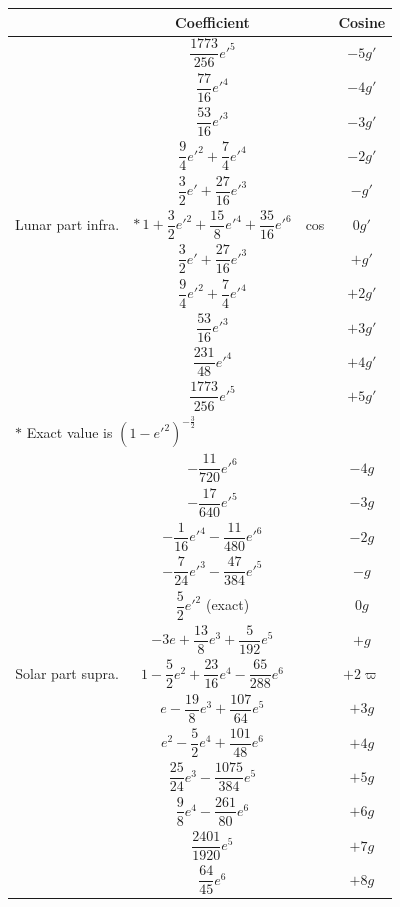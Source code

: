 \documentclass[10pt,a4paper]{article}
\theoremstyle{definition}
\begin{document}
\begin{center}
\begin{tabular}{c|c|c|c}
\toprule
& Coefficient & & Cosine \\
\midrule
\multirow{11}{*}{\parbox{2.5cm}{\centering Lunar part infra.}} 
& $\dfrac{1773}{256}e'^5$ & \multirow{11}{*}{cos} & $-5g'$ \\
& $\dfrac{77}{16}e'^4$ & & $-4g'$ \\
& $\dfrac{53}{16}e'^3$ & & $-3g'$ \\
& $\dfrac{9}{4}e'^2 + \dfrac{7}{4}e'^4$ & & $-2g'$ \\
& $\dfrac{3}{2}e' + \dfrac{27}{16}e'^3$ & & $-g'$ \\
& $*\,1 + \dfrac{3}{2}e'^2 + \dfrac{15}{8}e'^4 + \dfrac{35}{16}e'^6$ & & $0g'$ \\
& $\dfrac{3}{2}e' + \dfrac{27}{16}e'^3$ & & $+g'$ \\
& $\dfrac{9}{4}e'^2 + \dfrac{7}{4}e'^4$ & & $+2g'$ \\
& $\dfrac{53}{16}e'^3$ & & $+3g'$ \\
& $\dfrac{231}{48}e'^4$ & & $+4g'$ \\
& $\dfrac{1773}{256}e'^5$ & & $+5g'$ \\[6pt]
\multicolumn{4}{l}{$*$ Exact value is $(1 - e'^2)^{-\frac{3}{2}}$} \\
\midrule
\multirow{13}{*}{\parbox{2.5cm}{\centering Solar part supra.}} 
& $-\dfrac{11}{720}e'^6$ & \multirow{13}{*}{} & $-4g$ \\
& $-\dfrac{17}{640}e'^5$ & & $-3g$ \\
& $-\dfrac{1}{16}e'^4 - \dfrac{11}{480}e'^6$ & & $-2g$ \\
& $-\dfrac{7}{24}e'^3 - \dfrac{47}{384}e'^5$ & & $-g$ \\
& $\dfrac{5}{2}e'^2$ (exact) & & $0g$ \\
& $-3e + \dfrac{13}{8}e^3 + \dfrac{5}{192}e^5$ & & $+g$ \\
& $1 - \dfrac{5}{2}e^2 + \dfrac{23}{16}e^4 - \dfrac{65}{288}e^6$ & $+2g$ & $+2\varpi$ \\
& $e - \dfrac{19}{8}e^3 + \dfrac{107}{64}e^5$ & & $+3g$ \\
& $e^2 - \dfrac{5}{2}e^4 + \dfrac{101}{48}e^6$ & & $+4g$ \\
& $\dfrac{25}{24}e^3 - \dfrac{1075}{384}e^5$ & & $+5g$ \\
& $\dfrac{9}{8}e^4 - \dfrac{261}{80}e^6$ & & $+6g$ \\
& $\dfrac{2401}{1920}e^5$ & & $+7g$ \\
& $\dfrac{64}{45}e^6$ & & $+8g$ \\
\bottomrule
\end{tabular}
\end{center}
\end{document}
